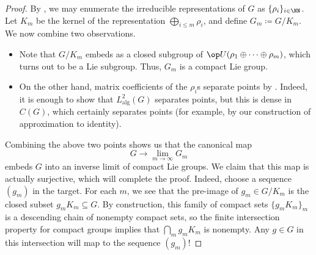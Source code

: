 \documentclass[../notes.tex]{subfiles}
\begin{document}
\begin{proof}
	By , we may enumerate the irreducible representations of $G$ as $\{\rho_i\}_{i\in\NN}$. Let $K_m$ be the kernel of the representation $\bigoplus_{i\le m}\rho_i$, and define $G_m\coloneqq G/K_m$. We now combine two observations.
	\begin{itemize}
		\item Note that $G/K_m$ embeds as a closed subgroup of $\op U(\rho_1\oplus\cdots\oplus\rho_m)$, which turns out to be a Lie subgroup. Thus, $G_m$ is a compact Lie group.
		\item On the other hand, matrix coefficients of the $\rho_i$s separate points by . Indeed, it is enough to show that $L^2_{\mathrm{alg}}(G)$ separates points, but this is dense in $C(G)$, which certainly separates points (for example, by our construction of approximation to identity).
	\end{itemize}
	Combining the above two points shows us that the canonical map
	\[G\to\lim_{m\to\infty}G_m\]
	embeds $G$ into an inverse limit of compact Lie groups. We claim that this map is actually surjective, which will complete the proof. Indeed, choose a sequence $(g_m)$ in the target. For each $m$, we see that the pre-image of $g_m\in G/K_m$ is the closed subset $g_mK_m\subseteq G$. By construction, this family of compact sets $\{g_mK_m\}_m$ is a descending chain of nonempty compact sets, so the finite intersection property for compact groups implies that $\bigcap_mg_mK_m$ is nonempty. Any $g\in G$ in this intersection will map to the sequence $(g_m)$!
\end{proof}
\end{document}

